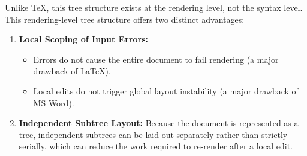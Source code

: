 Unlike \TeX{}, this tree structure exists at the rendering level, not the syntax level. This rendering-level tree structure offers two distinct advantages:

\begin{enumerate}
    \item \textbf{Local Scoping of Input Errors:}
          \begin{itemize}
              \item Errors do not cause the entire document to fail rendering (a major drawback of \LaTeX{}).
              \item Local edits do not trigger global layout instability (a major drawback of MS Word).
          \end{itemize}

    \item \textbf{Independent Subtree Layout:} Because the document is represented as a tree, independent subtrees can be laid out separately rather than strictly serially, which can reduce the work required to re-render after a local edit.
\end{enumerate}

